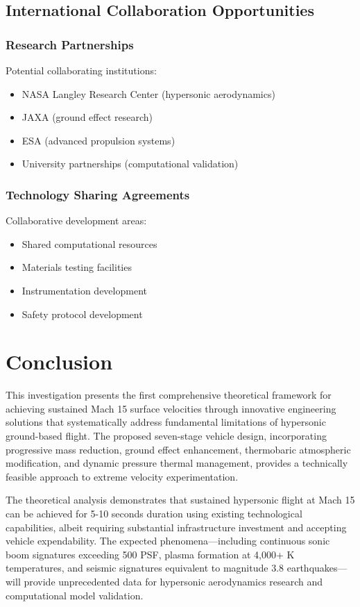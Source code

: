 \documentclass[12pt,a4paper]{article}
\begin{document}
\subsection{International Collaboration Opportunities}

\subsubsection{Research Partnerships}
Potential collaborating institutions:
\begin{itemize}
\item NASA Langley Research Center (hypersonic aerodynamics)
\item JAXA (ground effect research)
\item ESA (advanced propulsion systems)
\item University partnerships (computational validation)
\end{itemize}

\subsubsection{Technology Sharing Agreements}
Collaborative development areas:
\begin{itemize}
\item Shared computational resources
\item Materials testing facilities
\item Instrumentation development
\item Safety protocol development
\end{itemize}

\section{Conclusion}

This investigation presents the first comprehensive theoretical framework for achieving sustained Mach 15 surface velocities through innovative engineering solutions that systematically address fundamental limitations of hypersonic ground-based flight. The proposed seven-stage vehicle design, incorporating progressive mass reduction, ground effect enhancement, thermobaric atmospheric modification, and dynamic pressure thermal management, provides a technically feasible approach to extreme velocity experimentation.

The theoretical analysis demonstrates that sustained hypersonic flight at Mach 15 can be achieved for 5-10 seconds duration using existing technological capabilities, albeit requiring substantial infrastructure investment and accepting vehicle expendability. The expected phenomena---including continuous sonic boom signatures exceeding 500 PSF, plasma formation at 4,000+ K temperatures, and seismic signatures equivalent to magnitude 3.8 earthquakes---will provide unprecedented data for hypersonic aerodynamics research and computational model validation.
\end{document}
